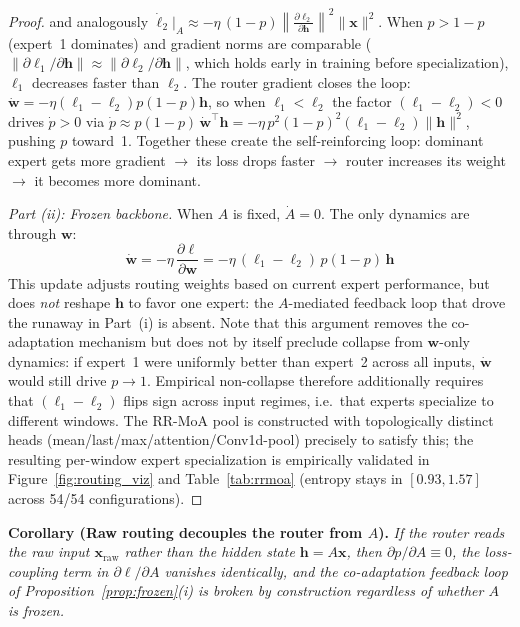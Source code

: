 \documentclass{article}
\begin{document}
\begin{proof}
and analogously $\dot{\ell}_2\big|_A \approx -\eta\,(1{-}p)\left\|\frac{\partial\ell_2}{\partial\mathbf{h}}\right\|^2\|\mathbf{x}\|^2$. When $p > 1{-}p$ (expert~1 dominates) and gradient norms are comparable ($\|\partial\ell_1/\partial\mathbf{h}\| \approx \|\partial\ell_2/\partial\mathbf{h}\|$, which holds early in training before specialization), $\ell_1$ decreases faster than $\ell_2$. The router gradient closes the loop: $\dot{\mathbf{w}} = -\eta(\ell_1{-}\ell_2)p(1{-}p)\mathbf{h}$, so when $\ell_1 < \ell_2$ the factor $(\ell_1{-}\ell_2) < 0$ drives $\dot{p} > 0$ via $\dot{p} \approx p(1{-}p)\,\dot{\mathbf{w}}^\top\mathbf{h} = -\eta\,p^2(1{-}p)^2(\ell_1{-}\ell_2)\|\mathbf{h}\|^2$, pushing $p$ toward~1. Together these create the self-reinforcing loop: dominant expert gets more gradient $\to$ its loss drops faster $\to$ router increases its weight $\to$ it becomes more dominant.

\emph{Part (ii): Frozen backbone.} When $A$ is fixed, $\dot{A} = 0$. The only dynamics are through $\mathbf{w}$:
\begin{equation*}
\dot{\mathbf{w}} = -\eta\,\frac{\partial\ell}{\partial\mathbf{w}} = -\eta\,(\ell_1 - \ell_2)\,p(1{-}p)\,\mathbf{h}
\end{equation*}
This update adjusts routing weights based on current expert performance, but does \emph{not} reshape $\mathbf{h}$ to favor one expert: the $A$-mediated feedback loop that drove the runaway in Part~(i) is absent. Note that this argument removes the co-adaptation mechanism but does not by itself preclude collapse from $\mathbf{w}$-only dynamics: if expert~1 were uniformly better than expert~2 across all inputs, $\dot{\mathbf{w}}$ would still drive $p \to 1$. Empirical non-collapse therefore additionally requires that $(\ell_1 - \ell_2)$ flips sign across input regimes, i.e.\ that experts specialize to different windows. The RR-MoA pool is constructed with topologically distinct heads (mean/last/max/attention/Conv1d-pool) precisely to satisfy this; the resulting per-window expert specialization is empirically validated in Figure~\ref{fig:routing_viz} and Table~\ref{tab:rrmoa} (entropy stays in $[0.93, 1.57]$ across 54/54 configurations).
\end{proof}

\textbf{Corollary (Raw routing decouples the router from $A$).}
\label{cor:raw_routing}
\emph{If the router reads the raw input $\mathbf{x}_\mathrm{raw}$ rather than the hidden state $\mathbf{h} = A\mathbf{x}$, then $\partial p / \partial A \equiv 0$, the loss-coupling term in $\partial\ell/\partial A$ vanishes identically, and the co-adaptation feedback loop of Proposition~\ref{prop:frozen}(i) is broken \emph{by construction} regardless of whether $A$ is frozen.}
\end{document}

